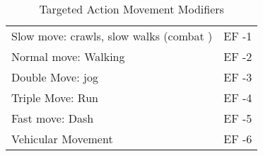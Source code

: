 \begin{table}[h]
\centering
\caption{Targeted Action Movement Modifiers}
	\begin{tabular}{ll} \hline
	Slow move: crawls, slow walks (combat )   & EF -1 \\
	Normal move: Walking                      & EF -2 \\
	Double Move: jog                          & EF -3 \\
	Triple Move: Run                          & EF -4 \\
	Fast move: Dash                           & EF -5 \\
	Vehicular Movement                        & EF -6 \\  \hline
	\end{tabular}
\end{table}
